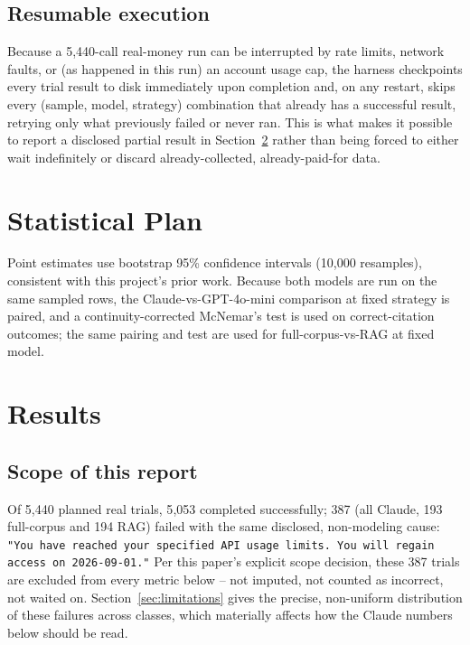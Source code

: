\documentclass[11pt]{article}
\begin{document}
\subsection{Resumable execution}

Because a 5{,}440-call real-money run can be interrupted by rate limits,
network faults, or (as happened in this run) an account usage cap, the
harness checkpoints every trial result to disk immediately upon completion
and, on any restart, skips every (sample, model, strategy) combination that
already has a successful result, retrying only what previously failed or
never ran. This is what makes it possible to report a disclosed partial
result in Section~\ref{sec:results} rather than being forced to either wait
indefinitely or discard already-collected, already-paid-for data.

\section{Statistical Plan}
\label{sec:stats}

Point estimates use bootstrap 95\% confidence intervals (10{,}000
resamples), consistent with this project's prior work. Because both models
are run on the same sampled rows, the Claude-vs-GPT-4o-mini comparison at
fixed strategy is paired, and a continuity-corrected McNemar's test is used
on correct-citation outcomes; the same pairing and test are used for
full-corpus-vs-RAG at fixed model.

\section{Results}
\label{sec:results}

\subsection{Scope of this report}

Of 5{,}440 planned real trials, 5{,}053 completed successfully; 387 (all
Claude, 193 full-corpus and 194 RAG) failed with the same disclosed,
non-modeling cause: \texttt{"You have reached your specified API usage
limits. You will regain access on 2026-09-01."} Per this paper's explicit
scope decision, these 387 trials are excluded from every metric below --
not imputed, not counted as incorrect, not waited on. Section~\ref{sec:limitations}
gives the precise, non-uniform distribution of these failures across
classes, which materially affects how the Claude numbers below should be
read.
\end{document}
